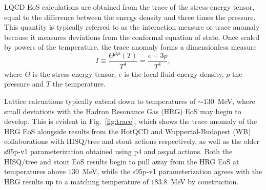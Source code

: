 \documentclass[aps,prc,reprint,amsmath,nofootinbib,superscriptaddress]{revtex4-1}
\begin{document}
LQCD EoS calculations are obtained from the trace of the stress-energy tensor, equal to the difference between the energy density and three times the pressure. 
This quantity is typically referred to as the interaction measure or trace anomaly  because it measures deviations from the conformal equation of state. 
Once scaled by powers of the temperature, the trace anomaly forms a dimensionless measure 
\begin{equation}
 I \equiv \frac{\Theta^{\mu\mu}(T)}{T^4} = \frac{e - 3p}{T^4},
\end{equation}
where $\Theta$ is the stress-energy tensor, $e$ is the local fluid energy density, $p$ the pressure and $T$ the temperature.

Lattice calcuations typically extend down to temperatures of ${\sim}130$~MeV, where small deviations with the Hadron Resonance Gas (HRG) EoS may begin to develop.
This is evident in Fig.~\ref{fig:trace}, which shows the trace anomaly of the HRG EoS alongside results from the HotQCD and Wuppertal-Budapest (WB) collaborations with HISQ/tree and stout actions respectively, as well as the older s95p-v1 parameterization obtained using p4 and asqad actions.  
Both the HISQ/tree and stout EoS results begin to pull away from the HRG EoS at temperatures above $130$~MeV, while the s95p-v1 parameterization agrees with the HRG results up to a matching temperature of $183.8$~MeV by construction.
\end{document}
